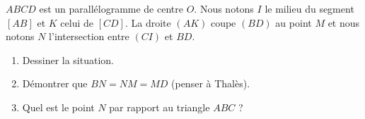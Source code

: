 
\begin{exercice}\label{exoSeconde-0098}

    \( ABCD\) est un parallélogramme de centre \( O\). Nous notons \( I\) le milieu du segment \( [AB]\) et \( K\) celui de \( [CD]\). La droite \( (AK)\) coupe \( (BD)\) au point \( M\) et nous notons \( N\) l'intersection entre \( (CI)\) et \( BD\).
    \begin{enumerate}
        \item
            Dessiner la situation.
        \item
            Démontrer que \( BN=NM=MD\) (penser à Thalès).
        \item
            Quel est le point \( N\) par rapport au triangle \( ABC\) ?
    \end{enumerate}

\end{exercice}
